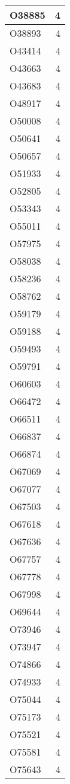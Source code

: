 \documentclass[
]{book}
\theoremstyle{definition}
\theoremstyle{definition}
\theoremstyle{definition}
\theoremstyle{definition}
\theoremstyle{remark}
\begin{document}
\begin{table}
\begin{tabular}{l|r}
\hline
O38885 & 4\\
\hline
O38893 & 4\\
\hline
O43414 & 4\\
\hline
O43663 & 4\\
\hline
O43683 & 4\\
\hline
O48917 & 4\\
\hline
O50008 & 4\\
\hline
O50641 & 4\\
\hline
O50657 & 4\\
\hline
O51933 & 4\\
\hline
O52805 & 4\\
\hline
O53343 & 4\\
\hline
O55011 & 4\\
\hline
O57975 & 4\\
\hline
O58038 & 4\\
\hline
O58236 & 4\\
\hline
O58762 & 4\\
\hline
O59179 & 4\\
\hline
O59188 & 4\\
\hline
O59493 & 4\\
\hline
O59791 & 4\\
\hline
O60603 & 4\\
\hline
O66472 & 4\\
\hline
O66511 & 4\\
\hline
O66837 & 4\\
\hline
O66874 & 4\\
\hline
O67069 & 4\\
\hline
O67077 & 4\\
\hline
O67503 & 4\\
\hline
O67618 & 4\\
\hline
O67636 & 4\\
\hline
O67757 & 4\\
\hline
O67778 & 4\\
\hline
O67998 & 4\\
\hline
O69644 & 4\\
\hline
O73946 & 4\\
\hline
O73947 & 4\\
\hline
O74866 & 4\\
\hline
O74933 & 4\\
\hline
O75044 & 4\\
\hline
O75173 & 4\\
\hline
O75521 & 4\\
\hline
O75581 & 4\\
\hline
O75643 & 4\\

\end{tabular}
\end{table}
\end{document}
